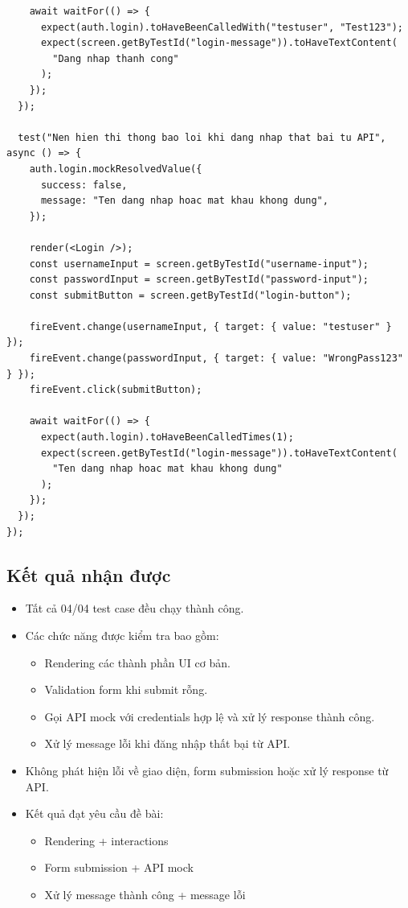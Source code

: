\documentclass[a4paper,12pt]{article}
\begin{document}
\begin{tcolorbox}[breakable, colback=green!5,colframe=black!50,title=Login Component Integration Tests]
\begin{lstlisting}
    await waitFor(() => {
      expect(auth.login).toHaveBeenCalledWith("testuser", "Test123");
      expect(screen.getByTestId("login-message")).toHaveTextContent(
        "Dang nhap thanh cong"
      );
    });
  });

  test("Nen hien thi thong bao loi khi dang nhap that bai tu API", async () => {
    auth.login.mockResolvedValue({
      success: false,
      message: "Ten dang nhap hoac mat khau khong dung",
    });

    render(<Login />);
    const usernameInput = screen.getByTestId("username-input");
    const passwordInput = screen.getByTestId("password-input");
    const submitButton = screen.getByTestId("login-button");

    fireEvent.change(usernameInput, { target: { value: "testuser" } });
    fireEvent.change(passwordInput, { target: { value: "WrongPass123" } });
    fireEvent.click(submitButton);

    await waitFor(() => {
      expect(auth.login).toHaveBeenCalledTimes(1);
      expect(screen.getByTestId("login-message")).toHaveTextContent(
        "Ten dang nhap hoac mat khau khong dung"
      );
    });
  });
});
\end{lstlisting}
\end{tcolorbox}
\subsection*{Kết quả nhận được}

\begin{itemize}
    \item Tất cả 04/04 test case đều chạy thành công.
    \item Các chức năng được kiểm tra bao gồm:
    \begin{itemize}
        \item Rendering các thành phần UI cơ bản.
        \item Validation form khi submit rỗng.
        \item Gọi API mock với credentials hợp lệ và xử lý response thành công.
        \item Xử lý message lỗi khi đăng nhập thất bại từ API.
    \end{itemize}
    \item Không phát hiện lỗi về giao diện, form submission hoặc xử lý response từ API.
    \item Kết quả đạt yêu cầu đề bài:
    \begin{itemize}
        \item Rendering + interactions
        \item Form submission + API mock
        \item Xử lý message thành công + message lỗi
    \end{itemize}
\end{itemize}
\end{document}
